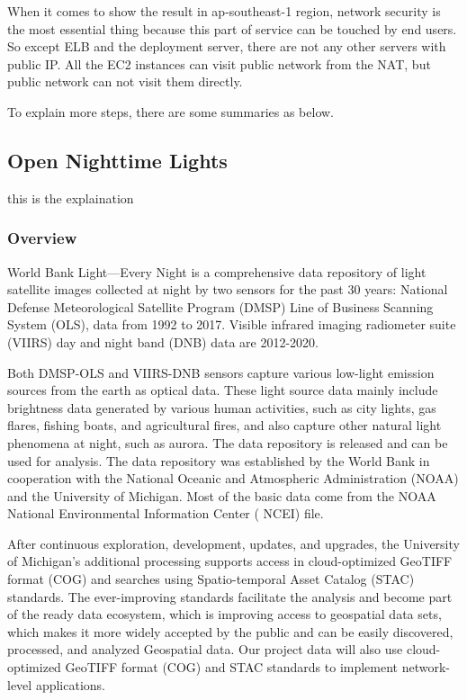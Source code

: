 \documentclass[conference]{IEEEtran}
\begin{document}
When it comes to show the result in ap-southeast-1 region, network security is the most essential thing because this part of service can be touched by end users. 
So except ELB and the deployment server, there are not any other servers with public IP. All the EC2 instances can visit public network from the NAT, but public network 
can not visit them directly.

To explain more steps, there are some summaries as below. 

\subsection{Open Nighttime Lights}
this is the explaination  \cite{BARA2020106658}

	\subsubsection{Overview}
World Bank Light---Every Night is a comprehensive data repository of light satellite images collected at night by two sensors for the past 30 years: National Defense Meteorological Satellite Program (DMSP) Line of Business Scanning System (OLS), data from 1992 to 2017.
Visible infrared imaging radiometer suite (VIIRS) day and night band (DNB) data are 2012-2020.

Both DMSP-OLS and VIIRS-DNB sensors capture various low-light emission sources from the earth as optical data. These light source data mainly include brightness data generated by various human activities, such as city lights, gas flares, fishing boats, and agricultural fires, and also capture other natural light phenomena at night, such as aurora. The data repository is released and can be used for analysis. The data repository was established by the World Bank in cooperation with the National Oceanic and Atmospheric Administration (NOAA) and the University of Michigan. Most of the basic data come from the NOAA National Environmental Information Center ( NCEI) file.

After continuous exploration, development, updates, and upgrades, the University of Michigan’s additional processing supports access in cloud-optimized GeoTIFF format (COG) and searches using Spatio-temporal Asset Catalog (STAC) standards. The ever-improving standards facilitate the analysis and become part of the ready data ecosystem, which is improving access to geospatial data sets, which makes it more widely accepted by the public and can be easily discovered, processed, and analyzed Geospatial data. Our project data will also use cloud-optimized GeoTIFF format (COG) and STAC standards to implement network-level applications.
\end{document}
